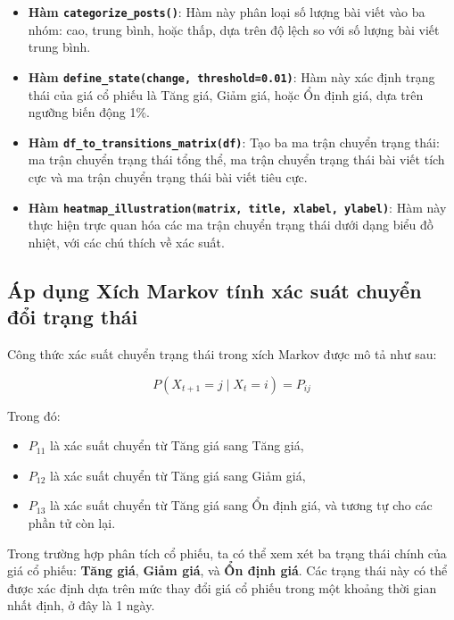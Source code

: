 \begin{itemize}
    \item \textbf{Hàm \texttt{categorize\_posts()}}: Hàm này phân loại số lượng bài viết vào ba nhóm: cao, trung bình, hoặc thấp, dựa trên độ lệch so với số lượng bài viết trung bình.

    \item \textbf{Hàm \texttt{define\_state(change, threshold=0.01)}}: Hàm này xác định trạng thái của giá cổ phiếu là Tăng giá, Giảm giá, hoặc Ổn định giá, dựa trên ngưỡng biến động 1\%.
    
    \item \textbf{Hàm \texttt{df\_to\_transitions\_matrix(df)}}: Tạo ba ma trận chuyển trạng thái: ma trận chuyển trạng thái tổng thể, ma trận chuyển trạng thái bài viết tích cực và ma trận chuyển trạng thái bài viết tiêu cực.

    \item \textbf{Hàm \texttt{heatmap\_illustration(matrix, title, xlabel, ylabel)}}: Hàm này thực hiện trực quan hóa các ma trận chuyển trạng thái dưới dạng biểu đồ nhiệt, với các chú thích về xác suất.
\end{itemize}

\subsection{Áp dụng Xích Markov tính xác suát chuyển đổi trạng thái}

Công thức xác suất chuyển trạng thái trong xích Markov được mô tả như sau:

\[
P(X_{t+1} = j \mid X_t = i) = P_{ij}
\]

Trong đó:
\begin{itemize}
    \item \( P_{11} \) là xác suất chuyển từ Tăng giá sang Tăng giá,
    \item \( P_{12} \) là xác suất chuyển từ Tăng giá sang Giảm giá,
    \item \( P_{13} \) là xác suất chuyển từ Tăng giá sang Ổn định giá, và tương tự cho các phần tử còn lại.
\end{itemize}

Trong trường hợp phân tích cổ phiếu, ta có thể xem xét ba trạng thái chính của giá cổ phiếu: \textbf{Tăng giá}, \textbf{Giảm giá}, và \textbf{Ổn định giá}. Các trạng thái này có thể được xác định dựa trên mức thay đổi giá cổ phiếu trong một khoảng thời gian nhất định, ở đây là 1 ngày.\\


